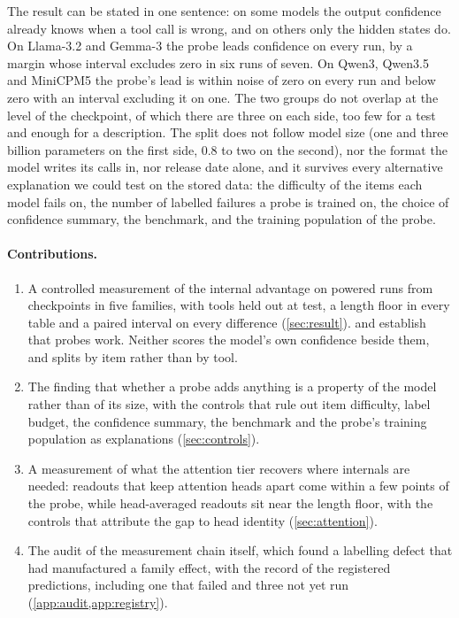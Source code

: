 The result can be stated in one sentence: on some models the output confidence already knows when a tool call is wrong, and on others only the hidden states do. On Llama-3.2 and Gemma-3 the probe leads confidence on every run, by a margin whose interval excludes zero in six runs of seven. On Qwen3, Qwen3.5 and MiniCPM5 the probe's lead is within noise of zero on every run and below zero with an interval excluding it on one. The two groups do not overlap at the level of the checkpoint, of which there are three on each side, too few for a test and enough for a description. The split does not follow model size (one and three billion parameters on the first side, 0.8 to two on the second), nor the format the model writes its calls in, nor release date alone, and it survives every alternative explanation we could test on the stored data: the difficulty of the items each model fails on, the number of labelled failures a probe is trained on, the choice of confidence summary, the benchmark, and the training population of the probe.

\paragraph{Contributions.}
\begin{enumerate}[topsep=1pt,itemsep=1pt,leftmargin=1.3em]
\item A controlled measurement of the internal advantage on \nRunsPowered{} powered runs from \nCkpt{} checkpoints in five families, with tools held out at test, a length floor in every table and a paired interval on every difference (\cref{sec:result}). \citet{healy2026internal} and \citet{yeats2026calls} establish that probes work. Neither scores the model's own confidence beside them, and \citet{yeats2026calls} splits by item rather than by tool.
\item The finding that whether a probe adds anything is a property of the model rather than of its size, with the controls that rule out item difficulty, label budget, the confidence summary, the benchmark and the probe's training population as explanations (\cref{sec:controls}).
\item A measurement of what the attention tier recovers where internals are needed: readouts that keep attention heads apart come within a few points of the probe, while head-averaged readouts sit near the length floor, with the controls that attribute the gap to head identity (\cref{sec:attention}).
\item The audit of the measurement chain itself, which found a labelling defect that had manufactured a family effect, with the record of the registered predictions, including one that failed and three not yet run (\cref{app:audit,app:registry}).
\end{enumerate}

